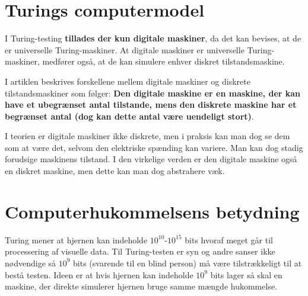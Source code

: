 \documentclass{article}
\author{Mikkel K. Mathiesen, Jannik Gram, Rune \& Rasmus Abrahams{\tt (son|en)}}
\title{}
\date{\today}
\begin{document}
\maketitle
\section{Turings computermodel}




I Turing-testing {\bf tillades der kun digitale maskiner}, da det kan bevises, at de er universelle Turing-maskiner. At digitale maskiner er universelle Turing-maskiner, medfører også, at de kan simulere enhver diskret tilstandsmaskine.

I artiklen beskrives forskellene mellem digitale maskiner og diskrete tilstandsmaskiner som følger: {\bf Den digitale maskine er en maskine, der kan have et ubegrænset antal tilstande, mens den diskrete maskine har et begrænset antal (dog kan dette antal være uendeligt stort)}.

I teorien er digitale maskiner ikke diskrete, men i praksis kan man dog se dem som at være det, selvom den elektriske spænding kan variere. Man kan dog stadig forudsige maskinens tilstand. I den virkelige verden er den digitale maskine også en diskret maskine, men dette kan man dog abstrahere væk.

\section{Computerhukommelsens betydning}
Turing mener at hjernen kan indeholde $10^{10}$-$10^{15}$ bits hvoraf meget går til processering af visuelle data. Til Turing-testen er syn og andre sanser ikke nødvendige så $10^9$ bits (svarende til en blind person) må være tilstrækkeligt til at bestå testen.
Ideen er at hvis hjernen kan indeholde $10^9$ bits lager så skal en maskine, der direkte simulerer hjernen bruge samme mængde hukommelse.
\end{document}
